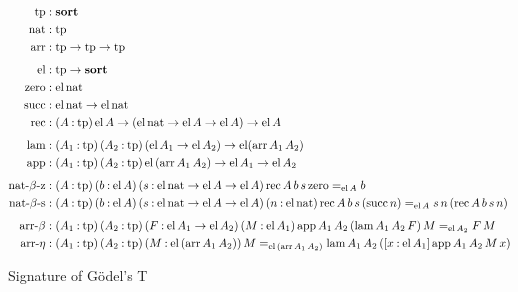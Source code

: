 \documentclass[11pt,twoside]{article}
\newcommand{\parens}[1]{(#1)}
\newcommand{\sortclass}{\ensuremath{\textbf{sort}}}
\newcommand{\eqclass}[3]{{#2}=_{#1}{#3}}
\newcommand{\piclass}[3]{({#2}\mathbin{:}{#1})\,{#3}}
\newcommand{\arrclass}[2]{{#1}\to{#2}}
\newcommand{\lamobj}[3]{[{#2}\mathbin{:}{#1}]\,{#3}}
\newcommand{\appobj}[2]{{#1}\,{#2}}
\begin{document}
\begin{figure}
  
  \begin{align*}
    \tpsort
    & : \sortclass \\
    \nattp
    & : \tpsort \\
    \arrtp
    & : \arrclass{\tpsort}{\arrclass{\tpsort}{\tpsort}} \\[1ex]
    \elfam
%
    & : \arrclass{\tpsort}{\sortclass} \\
    \zerocon
    & : \elof{\nattp} \\
    \succcon
    & : \arrclass {\elof{\nattp}}{\elof{\nattp}} \\
    \reccon
    &  :
      \piclass{\tpsort}{A}{
      \arrclass{\elof{A}}{
      \arrclass{\parens{\arrclass{\elof{\nattp}}{\arrclass{\elof{A}}{\elof{A}}}}}{
      \elof{A}}}} \\[1ex] 
%
    \lamcon
    & :
      \piclass{\tpsort}{A_{1}}{
      \piclass{\tpsort}{A_{2}}{
      \arrclass{\parens{\arrclass{\elof{A_{1}}}{\elof{A_{2}}}}}{
      \elfam{\parens{\arrof{A_{1}}{A_{2}}}}}}} \\
    \appcon
    & :
      \piclass{\tpsort}{A_{1}}{
      \piclass{\tpsort}{A_{2}}{
      \arrclass{\elof{\parens{\arrof{A_{1}}{A_{2}}}}}{
      \arrclass{\elof{A_{1}}}{\elof{A_{2}}}}}} \\[1ex]
%
    \reczcon
    & :
      \piclass{\tpsort}{A}{
      \piclass{\elof{A}}{b}{
      \piclass{\arrclass{\elof{\nattp}}{\arrclass{\elof{A}}{\elof{A}}}}{s}{
      \eqclass{\elof{A}}{\recof{A}{b}{s}{\zerocon}}{b}}}} \\
    \recscon
    & :
      \piclass{\tpsort}{A}{
      \piclass{\elof{A}}{b}{
      \piclass{\arrclass{\elof{\nattp}}{\arrclass{\elof{A}}{\elof{A}}}}{s}{
      \piclass{\elof{\nattp}}{n}{
      \eqclass{\elof{A}}
      {\recof{A}{b}{s}{\parens{\succof{n}}}}{\appobj{\appobj{s}{n}}{\parens{\recof{A}{b}{s}{n}}}}}}}} \\[1ex]
%
    \betacon
    & :
      \piclass{\tpsort}{A_{1}}{
      \piclass{\tpsort}{A_{2}}{
      \piclass{\arrclass{\elof{A_{1}}}{\elof{A_{2}}}}{F}{
      \piclass{\elof{A_{1}}}{M}{
      \eqclass{\elof{A_{2}}}
      {\appof{A_{1}}{A_{2}}{\parens{\lamof{A_{1}}{A_{2}}{F}}}{M}}
      {\appobj{F}{M}}}}}} \\
    \etacon
    & :
      \piclass{\tpsort}{A_{1}}{
      \piclass{\tpsort}{A_{2}}{
      \piclass{\elof{\parens{\arrof{A_{1}}{A_{2}}}}}{M}{
      \eqclass{\elof{\parens{\arrof{A_{1}}{A_{2}}}}}
      {M}
      {\lamof{A_{1}}{A_{2}}{\parens{\lamobj{\elof{A_{1}}}{x}{\appof{A_{1}}{A_{2}}{M}{x}}}}}}}}
  \end{align*}

  \caption{Signature of G\"odel's T}
  \label{fig:t-sig}
\end{figure}
\end{document}
